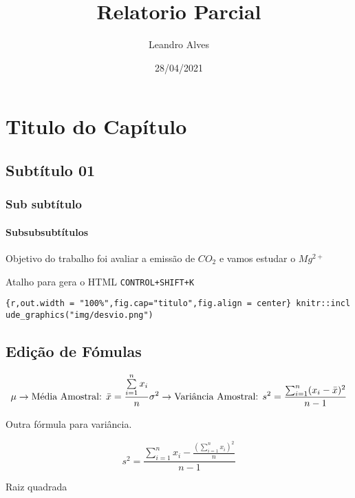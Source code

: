 \documentclass[
]{article}
\title{Relatorio Parcial}
\author{Leandro Alves}
\date{28/04/2021}
\begin{document}
\maketitle

\hypertarget{titulo-do-capuxedtulo}{%
\section{Titulo do Capítulo}\label{titulo-do-capuxedtulo}}

\hypertarget{subtuxedtulo-01}{%
\subsection{Subtítulo 01}\label{subtuxedtulo-01}}

\hypertarget{sub-subtuxedtulo}{%
\subsubsection{Sub subtítulo}\label{sub-subtuxedtulo}}

\hypertarget{subsubsubtuxedtulos}{%
\paragraph{Subsubsubtítulos}\label{subsubsubtuxedtulos}}

Objetivo do trabalho foi avaliar a emissão de \(CO_{2}\) e vamos estudar
o \(Mg^{2+}\)

Atalho para gera o HTML \texttt{CONTROL+SHIFT+K}

\texttt{\{r,out.width\ =\ "100\%",fig.cap="titulo",fig.align\ =\ \textquotesingle{}center\textquotesingle{}\}\ knitr::include\_graphics("img/desvio.png")}

\hypertarget{ediuxe7uxe3o-de-fuxf3mulas}{%
\subsection{Edição de Fómulas}\label{ediuxe7uxe3o-de-fuxf3mulas}}

\[
\mu \rightarrow \text{Média Amostral: } \bar{x} = \frac{\sum \limits_{i=1}^n x_i}{n} \\
\sigma^2 \rightarrow \text{Variância Amostral: } s^2 = \frac{\sum_{i=1}^n (x_i - \bar{x} )^2}{n-1}
\]

Outra fórmula para variância.

\[
s^2 = \frac{\sum \limits_{i=1}^n x_i - \frac{\left(\sum \limits_{i=1}^n x_i \right)^2}{n} }{n-1}
\]

Raiz quadrada
\end{document}
